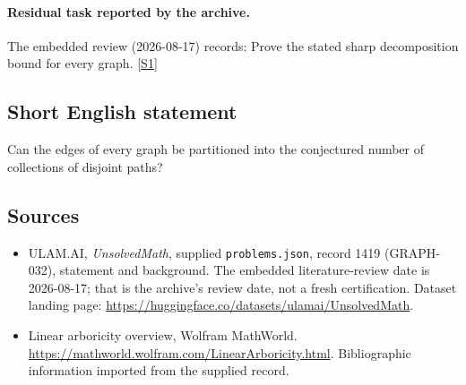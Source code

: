 \documentclass[11pt,a4paper]{article}
\newcommand{\sref}[2]{\hyperlink{source:#1:#2}{[S#2]}}
\begin{document}
\paragraph{Residual task reported by the archive.}

The embedded review (2026-08-17) records: Prove the stated sharp decomposition bound for every graph. \sref{1419}{1}

\subsection{Short English statement}

Can the edges of every graph be partitioned into the conjectured number of collections of disjoint paths?

\subsection{Sources}

{\small

\begin{itemize}

\item[\hypertarget{source:1419:1}{S1}] ULAM.AI, \emph{UnsolvedMath}, supplied \texttt{problems.json}, record 1419 (GRAPH-032), statement and background. The embedded literature-review date is 2026-08-17; that is the archive’s review date, not a fresh certification. Dataset landing page: \url{https://huggingface.co/datasets/ulamai/UnsolvedMath}.

\item[\hypertarget{source:1419:2}{S2}] Linear arboricity overview, Wolfram MathWorld. \url{https://mathworld.wolfram.com/LinearArboricity.html}. Bibliographic information imported from the supplied record.

\end{itemize}

}

\label{end:1419}
\end{document}
